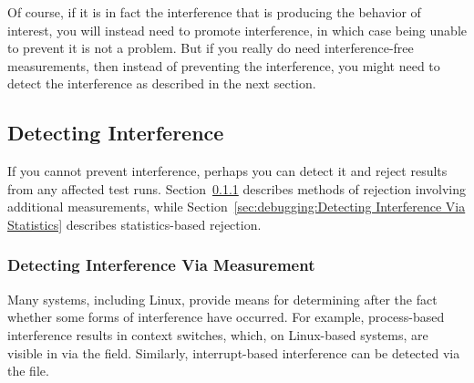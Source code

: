 \QuickQuizEnd

Of course, if it is in fact the interference that is producing the
behavior of interest, you will instead need to promote interference,
in which case being unable to prevent it is not a problem.
But if you really do need interference-free measurements, then instead
of preventing the interference, you might need to detect the interference
as described in the next section.

\subsection{Detecting Interference}
\label{sec:debugging:Detecting Interference}

If you cannot prevent interference, perhaps you can detect it
and reject results from any affected test runs.
Section~\ref{sec:debugging:Detecting Interference Via Measurement}
describes methods of rejection involving additional measurements,
while Section~\ref{sec:debugging:Detecting Interference Via Statistics}
describes statistics-based rejection.

\subsubsection{Detecting Interference Via Measurement}
\label{sec:debugging:Detecting Interference Via Measurement}


Many systems, including Linux, provide means for determining after the
fact whether some forms of interference have occurred.
For example, process-based interference results in context switches,
which, on Linux-based systems, are visible in
 via the  field.
Similarly, interrupt-based interference can be detected via the
 file.

